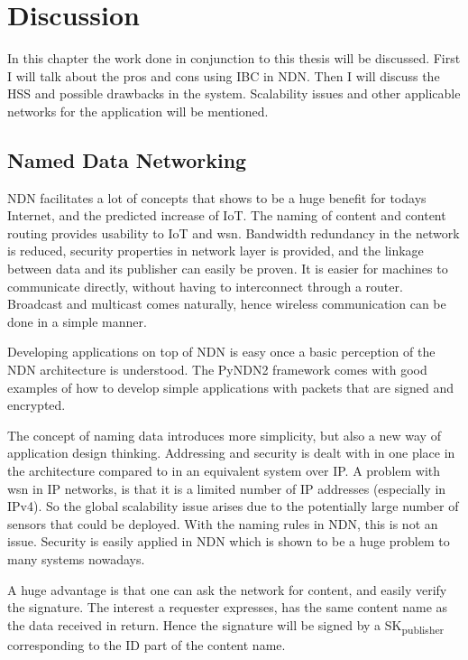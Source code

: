 \chapter{Discussion}
In this chapter the work done in conjunction to this thesis will be discussed. 
First I will talk about the pros and cons using \gls{IBC} in \gls{NDN}.
Then I will discuss the \gls{HSS} and possible drawbacks in the system. 
Scalability issues and other applicable networks for the application will be mentioned.

\section{Named Data Networking}
\gls{NDN} facilitates a lot of concepts that shows to be a huge benefit for todays Internet, and the predicted increase of \gls{IoT}.
The naming of content and content routing provides usability to \gls{IoT} and \gls{wsn}.
Bandwidth redundancy in the network is reduced, security properties in network layer is provided, and the linkage between data and its publisher can easily be proven. 
It is easier for machines to communicate directly, without having to interconnect through a router.
Broadcast and multicast comes naturally, hence wireless communication can be done in a simple manner.

Developing applications on top of \gls{NDN} is easy once a basic perception of the \gls{NDN} architecture is understood.
The \gls{PyNDN2} framework comes with good examples of how to develop simple applications with packets that are signed and encrypted.

The concept of naming data introduces more simplicity, but also a new way of application design thinking.
Addressing and security is dealt with in one place in the architecture compared to in an equivalent system over \gls{IP}. 
A problem with \gls{wsn} in \gls{IP} networks, is that it is a limited number of \gls{IP} addresses (especially in \gls{IPv4}).
So the global scalability issue arises due to the potentially large number of sensors that could be deployed. 
With the naming rules in \gls{NDN}, this is not an issue.
Security is easily applied in \gls{NDN} which is shown to be a huge problem to many systems nowadays.

A huge advantage is that one can ask the network for content, and easily verify the signature.
The \gls{interest} a \gls{requester} expresses, has the same content \gls{name} as the \gls{data} received in return.
Hence the signature will be signed by a \gls{SK}\textsubscript{publisher} corresponding to the \gls{ID} part of the content \gls{name}.

